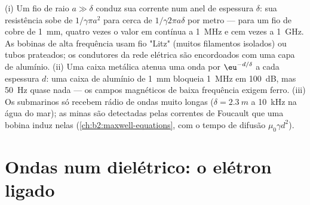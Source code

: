 \begin{example}\label{ex:b2:waves-in-media:skinuses}
(i) Um fio de raio $a \gg \delta$ conduz sua corrente num anel de
espessura $\delta$: sua resistência sobe de $1/\gamma\pi a^2$ para cerca de $1/\gamma
2\pi a\delta$ por metro --- para um fio de cobre de \qty{1}{mm}, quatro vezes o valor
em contínua a \qty{1}{MHz} e cem vezes a \qty{1}{GHz}. As bobinas de alta frequência
usam fio "Litz" (muitos filamentos isolados) ou tubos prateados; os
condutores da rede elétrica são encordoados com uma capa de alumínio. (ii) Uma
caixa metálica atenua uma onda por $\eu^{-d/\delta}$ a cada espessura $d$: uma
caixa de alumínio de \qty{1}{mm} bloqueia \qty{1}{MHz} em \qty{100}{dB}, mas \qty{50}{Hz}
quase nada --- os campos magnéticos de baixa frequência exigem ferro. (iii)
Os submarinos só recebem rádio de ondas muito longas ($\delta = \qty{2.3}{m}$ a
\qty{10}{kHz} na água do mar); as minas são detectadas pelas correntes de Foucault que uma
bobina induz nelas (\cref{ch:b2:maxwell-equations}, com o tempo de
difusão $\mu_0\gamma d^2$).
\end{example}

\section{Ondas num dielétrico: o elétron ligado}

